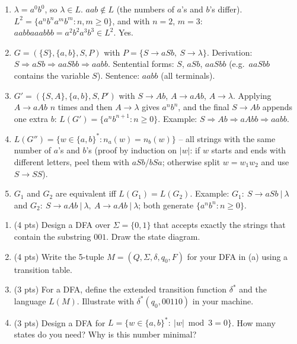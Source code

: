 \documentclass[11pt,a4paper]{article}
\newcounter{prob}
\newenvironment{problem}[1][]{%
  \refstepcounter{prob}%
  \begin{tcolorbox}[enhanced,breakable,colback=white,colframe=SteelBlue!70!black,
      boxrule=0.8pt,arc=1.5mm,left=5pt,right=5pt,top=3pt,bottom=3pt,
      before skip=8pt,after skip=8pt,
      title={\textbf{Question \theprob\ (#1)}},fonttitle=\bfseries, coltitle=white,
      colbacktitle=SteelBlue!70!black, boxed title style={arc=1mm}]}
{\end{tcolorbox}}
\newenvironment{solution}{%
  \begin{tcolorbox}[enhanced,breakable,colback=Honeydew!55,colframe=ForestGreen!60!black,
      boxrule=0.6pt,arc=1.5mm,left=5pt,right=5pt,top=3pt,bottom=3pt,
      before skip=6pt,after skip=10pt,
      title={\textbf{Solution \theprob}},fonttitle=\bfseries, coltitle=white,
      colbacktitle=ForestGreen!60!black, boxed title style={arc=1mm}]}
{\end{tcolorbox}}
\begin{document}
\begin{solution}
\begin{enumerate}[label=(\alph*)]
  \item $\lambda=a^0b^0$, so $\lambda\in L$. $aab\notin L$ (the
  numbers of $a$'s and $b$'s differ). $L^2=\{a^nb^na^mb^m:n,m\ge0\}$,
  and with $n=2$, $m=3$: $aabbaaabbb=a^2b^2a^3b^3\in L^2$. Yes.
  \item $G=(\{S\},\{a,b\},S,P)$ with $P=\{S\to aSb,\ S\to\lambda\}$.
  Derivation: $S\Rightarrow aSb\Rightarrow aaSbb\Rightarrow aabb$.
  Sentential forms: $S$, $aSb$, $aaSbb$ (e.g.\ $aaSbb$ contains the
  variable $S$). Sentence: $aabb$ (all terminals).
  \item $G'=(\{S,A\},\{a,b\},S,P')$ with $S\to Ab$, $A\to aAb$,
  $A\to\lambda$. Applying $A\to aAb$ $n$ times and then $A\to\lambda$
  gives $a^nb^n$, and the final $S\to Ab$ appends one extra $b$:
  $L(G')=\{a^nb^{n+1}:n\ge0\}$. Example: $S\Rightarrow Ab\Rightarrow aAbb\Rightarrow aabb$.
  \item $L(G'')=\{w\in\{a,b\}^*:n_a(w)=n_b(w)\}$ -- all strings with
  the same number of $a$'s and $b$'s (proof by induction on $|w|$:
  if $w$ starts and ends with different letters, peel them with
  $aSb$/$bSa$; otherwise split $w=w_1w_2$ and use $S\to SS$).
  \item $G_1$ and $G_2$ are equivalent iff $L(G_1)=L(G_2)$. Example:
  $G_1:\ S\to aSb\ |\ \lambda$ and $G_2:\ S\to aAb\ |\ \lambda,\ A\to aAb\ |\ \lambda$;
  both generate $\{a^nb^n:n\ge0\}$.
\end{enumerate}
\end{solution}

\begin{problem}[Deterministic Finite Accepters -- 14 points]
\begin{enumerate}[label=(\alph*)]
  \item (4 pts) Design a DFA over $\Sigma=\{0,1\}$ that accepts
  exactly the strings that contain the substring $001$. Draw the state
  diagram.
  \item (4 pts) Write the 5-tuple $M=(Q,\Sigma,\delta,q_0,F)$ for
  your DFA in (a) using a transition table.
  \item (3 pts) For a DFA, define the extended transition function
  $\delta^*$ and the language $L(M)$. Illustrate with $\delta^*(q_0,00110)$
  in your machine.
  \item (3 pts) Design a DFA for
  $L=\{w\in\{a,b\}^*:\ |w|\bmod 3=0\}$. How many states do you need? Why is this number minimal?
\end{enumerate}
\end{problem}
\end{document}
